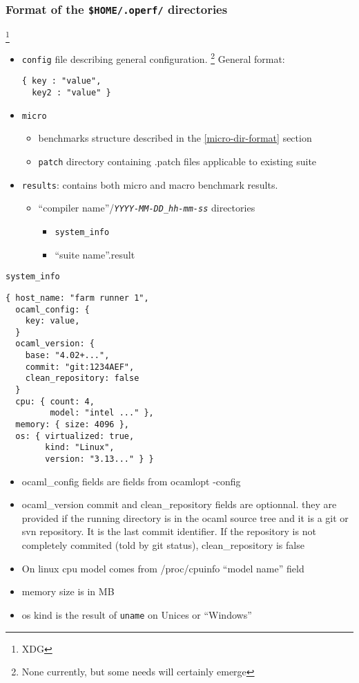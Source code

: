 \documentclass[11pt,a4paper]{article}
\begin{document}
\subsubsection{Format of the {\tt \$HOME/.operf/} directories}
\footnote{XDG}
\begin{itemize}
\item {\tt config} file describing general configuration.
  \footnote{None currently, but some needs will certainly emerge}
  General format:
\begin{verbatim}
{ key : "value",
  key2 : "value" }
\end{verbatim}
\item {\tt micro}
  \begin{itemize}
  \item benchmarks structure described in the \ref{micro-dir-format} section
  \item {\tt patch} directory containing .patch files applicable to existing suite
  \end{itemize}
\item {\tt results}: contains both micro and macro benchmark results.
  \begin{itemize}
  \item ``compiler name''/{\tt\em YYYY-MM-DD\_hh-mm-ss} directories
    \begin{itemize}
    \item {\tt system\_info}
    \item ``suite name''.result
    \end{itemize}
  \end{itemize}
\end{itemize}

{\tt system\_info}
\begin{verbatim}
{ host_name: "farm runner 1",
  ocaml_config: {
    key: value,
  }
  ocaml_version: {
    base: "4.02+...",
    commit: "git:1234AEF",
    clean_repository: false
  }
  cpu: { count: 4,
         model: "intel ..." },
  memory: { size: 4096 },
  os: { virtualized: true,
        kind: "Linux",
        version: "3.13..." } }
\end{verbatim}

\begin{itemize}
\item ocaml\_config fields are fields from ocamlopt -config
\item ocaml\_version commit and clean\_repository fields are
  optionnal.  they are provided if the running directory is in the
  ocaml source tree and it is a git or svn repository. It is the last
  commit identifier. If the repository is not completely commited
  (told by git status), clean\_repository is false
\item On linux cpu model comes from /proc/cpuinfo ``model name'' field
\item memory size is in MB
\item os kind is the result of {\tt uname} on Unices or ``Windows''
\end{itemize}
\end{document}
